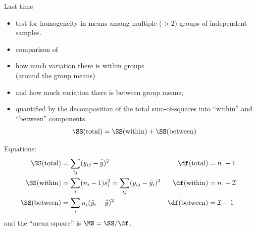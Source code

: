 %
%
%



\subtitle{and two-way ANOVA}

\date{16 November 2015}




\begin{frame}
  \maketitle
\end{frame}



\begin{frame}{Last time}
  \begin{itemize}
    \item {} test for homogeneity in means among multiple ($>2$) groups of independent samples.
    \item {} comparison of 
      \item how much variation there is within groups \\
        (around the group means)
      \item and how much variation there is between group means;
      \item quantified by the decomposition of the total sum-of-squares into ``within'' and ``between'' components.
          \[ 
       \SS(\text{total})  = \SS(\text{within}) + \SS(\text{between})  
   \]
  \end{itemize}

  Equations:
    \begin{align*}
        \SS(\text{total}) &= \sum_{ij} (y_{ij} - \bar {\bar y} )^2 
    &  \df(\text{total}) &= n_\cdot - 1 \\
      \SS(\text{within}) &= \sum_{i} (n_i-1) s_i^2 = \sum_{ij} (y_{ij}-\bar y_i)^2 
        &   \df(\text{within}) &= n_\cdot - \mathcal{I} \\
      \SS(\text{between}) &= \sum_{i} n_i (\bar y_i - \bar{\bar y})^2 
        & \df(\text{between}) &= \mathcal{I} - 1 \\
    \end{align*}
    and the ``mean square'' is $\MS = \SS / \df$.
    
\end{frame}


